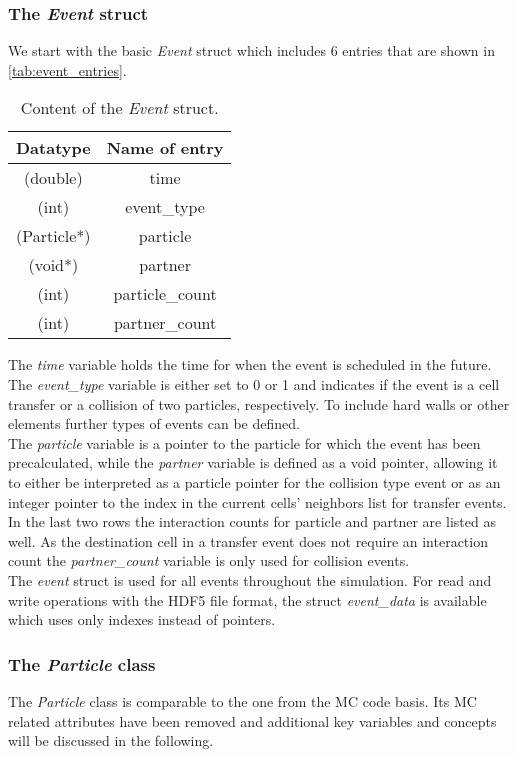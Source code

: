 \subsubsection{The \textit{Event} struct}
\label{sec:event_struct}
We start with the basic \textit{Event} struct which includes 6 entries that are shown in \autoref{tab:event_entries}.
\begin{table}[h!]
\centering
\begin{tabular}{c|c}
\textbf{Datatype} & \textbf{Name of entry}\\ \hline
(double) & time \\
(int) & event\_type \\
(Particle*)  & particle \\
(void*) & partner \\
(int) & particle\_count \\
(int) & partner\_count \\
\end{tabular}
\caption[\textit{Event} struct content]{Content of the \textit{Event} struct.}
\label{tab:event_entries}
\end{table}
The \textit{time} variable holds the time for when the event is scheduled in the future. The \textit{event\_type} variable is either set to 0 or 1 and indicates if the event is a cell transfer or a collision of two particles, respectively. To include hard walls or other elements further types of events can be defined.\\
The \textit{particle} variable is a pointer to the particle for which the event has been precalculated, while the \textit{partner} variable is defined as a void pointer, allowing it to either be interpreted as a particle pointer for the collision type event or as an integer pointer to the index in the current cells' neighbors list for transfer events.\\
In the last two rows the interaction counts for particle and partner are listed as well. As the destination cell in a transfer event does not require an interaction count the \textit{partner\_count} variable is only used for collision events.\\

The \textit{event} struct is used for all events throughout the simulation. For read and write operations with the HDF5 file format, the struct \textit{event\_data} is available which uses only indexes instead of pointers.

\subsubsection{The \textit{Particle} class}
\label{sec:particle_class}
The \textit{Particle} class is comparable to the one from the MC code basis. Its MC related attributes have been removed and additional key variables and concepts will be discussed in the following.\\

